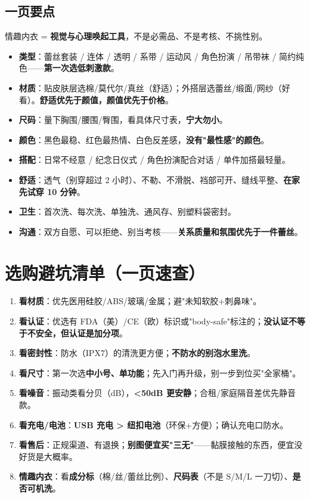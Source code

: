\documentclass[12pt,UTF8,openany]{ctexbook}
\begin{document}
\subsection*{一页要点}
情趣内衣 = \textbf{视觉与心理唤起工具}，不是必需品、不是考核、不挑性别。
\begin{itemize}[leftmargin=2em,itemsep=0.2em]
  \item \textbf{类型}：蕾丝套装 / 连体 / 透明 / 系带 / 运动风 / 角色扮演 / 吊带袜 / 简约纯色——\textbf{第一次选低刺激款}。
  \item \textbf{材质}：贴皮肤层选棉/莫代尔/真丝（舒适）；外搭层选蕾丝/缎面/网纱（好看）。\textbf{舒适优先于颜值，颜值优先于价格}。
  \item \textbf{尺码}：量下胸围/腰围/臀围，看具体尺寸表，\textbf{宁大勿小}。
  \item \textbf{颜色}：黑色最稳、红色最热情、白色反差感，\textbf{没有"最性感"的颜色}。
  \item \textbf{搭配}：日常不经意 / 纪念日仪式 / 角色扮演配合对话 / 单件加搭最轻量。
  \item \textbf{舒适}：透气（别穿超过 2 小时）、不勒、不滑脱、裆部可开、缝线平整、\textbf{在家先试穿 10 分钟}。
  \item \textbf{卫生}：首次洗、每次洗、单独洗、通风存、别塑料袋密封。
  \item \textbf{沟通}：双方自愿、可以拒绝、别当考核——\textbf{关系质量和氛围优先于一件蕾丝}。
\end{itemize}

\section{选购避坑清单（一页速查）}
\begin{enumerate}[leftmargin=2em,itemsep=0.2em]
  \item \textbf{看材质}：优先医用硅胶/ABS/玻璃/金属；避"未知软胶+刺鼻味"。
  \item \textbf{看认证}：优选有 FDA（美）/CE（欧）标识或"body-safe"标注的；\textbf{没认证不等于不安全，但认证是加分项}。
  \item \textbf{看密封性}：防水（IPX7）的清洗更方便；\textbf{不防水的别泡水里洗}。
  \item \textbf{看尺寸}：第一次选\textbf{中小号、单功能}；先入门再升级，别一步到位买"全家桶"。
  \item \textbf{看噪音}：振动类看分贝（dB），\textbf{<50dB 更安静}；合租/家庭隔音差优先静音款。
  \item \textbf{看充电/电池}：\textbf{USB 充电 > 纽扣电池}（环保+方便）；确认充电口防水。
  \item \textbf{看售后}：正规渠道、有退换；\textbf{别图便宜买"三无"}——黏膜接触的东西，便宜没好货是大概率。
  \item \textbf{情趣内衣}：看\textbf{成分标}（棉/丝/蕾丝比例）、\textbf{尺码表}（不是 S/M/L 一刀切）、\textbf{是否可机洗}。
\end{enumerate}
\end{document}
